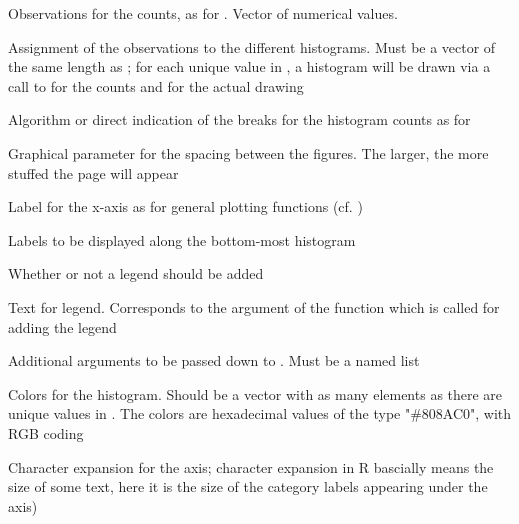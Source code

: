 \documentclass[a4paper]{book}
\begin{document}
\begin{Arguments}
\begin{ldescription}
\item[\code{x}] 
Observations for the counts, as for . Vector of numerical values.

\item[\code{levels}] 
Assignment of the observations to the different histograms. Must be a vector of the same length as ; for each unique value in , a histogram will be drawn via a call to  for the counts and  for the actual drawing

\item[\code{breaks}] 
Algorithm or direct indication of the breaks for the histogram counts as for 

\item[\code{overhead}] 
Graphical parameter for the spacing between the figures. The larger, the more stuffed the page will appear

\item[\code{xlab}] 
Label for the x-axis as for general plotting functions (cf. )

\item[\code{category\_labels}] 
Labels to be displayed along the bottom-most histogram

\item[\code{add.legend}] 
Whether or not a legend should be added
\item[\code{legend.text}] 
Text for legend. Corresponds to the  argument of the function  which is called for adding the legend
\item[\code{legend.args}] 
Additional arguments to be passed down to . Must be a named list
\item[\code{barcolors}] 
Colors for the histogram. Should be a vector with as many elements as there are unique values in . The colors are hexadecimal values of the type "\#808AC0", with RGB coding
\item[\code{cex.axis}]  Character expansion for the axis; character expansion in R bascially means the size of some text, here it is the size of the category labels appearing under the axis)


\end{ldescription}
\end{Arguments}
\end{document}
